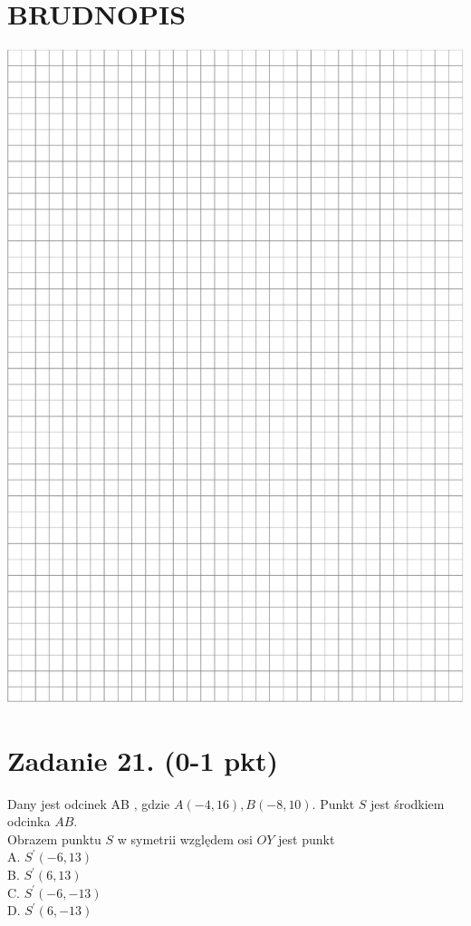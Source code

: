 \documentclass[10pt]{article}
\begin{document}
\section*{BRUDNOPIS}
\begin{center}
\includegraphics[max width=\textwidth]{2024_11_21_832f1bc2b626663f1df2g-07}
\end{center}

\section*{Zadanie 21. (0-1 pkt)}
Dany jest odcinek AB , gdzie \(A(-4,16), B(-8,10)\). Punkt \(S\) jest środkiem odcinka \(A B\).\\
Obrazem punktu \(S\) w symetrii względem osi \(O Y\) jest punkt\\
A. \(S^{\prime}(-6,13)\)\\
B. \(S^{\prime}(6,13)\)\\
C. \(S^{\prime}(-6,-13)\)\\
D. \(S^{\prime}(6,-13)\)
\end{document}
